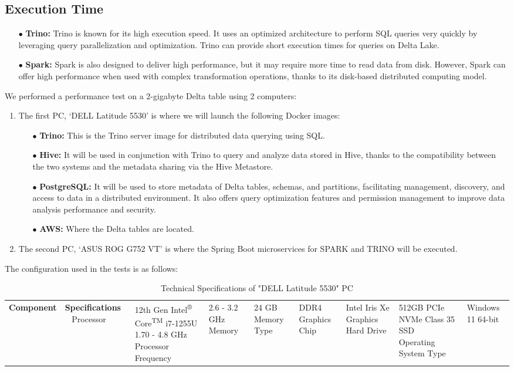 \subsection{Execution Time}
\begin{enumerate}
\item[$\bullet$] \textbf{Trino:} Trino is known for its high execution speed. It uses an optimized architecture to perform SQL queries very quickly by leveraging query parallelization and optimization. Trino can provide short execution times for queries on Delta Lake.
\item[$\bullet$] \textbf{Spark:} Spark is also designed to deliver high performance, but it may require more time to read data from disk. However, Spark can offer high performance when used with complex transformation operations, thanks to its disk-based distributed computing model.
\end{enumerate}

We performed a performance test on a 2-gigabyte Delta table using 2 computers:
\begin{enumerate}
\item The first PC, `DELL Latitude 5530' is where we will launch the following Docker images:
\begin{enumerate}
\item[$\bullet$] \textbf{Trino:} This is the Trino server image for distributed data querying using SQL.
\item[$\bullet$] \textbf{Hive:} It will be used in conjunction with Trino to query and analyze data stored in Hive, thanks to the compatibility between the two systems and the metadata sharing via the Hive Metastore.
\item[$\bullet$] \textbf{PostgreSQL:} It will be used to store metadata of Delta tables, schemas, and partitions, facilitating management, discovery, and access to data in a distributed environment. It also offers query optimization features and permission management to improve data analysis performance and security.
\item[$\bullet$] \textbf{AWS:} Where the Delta tables are located.
\end{enumerate}
\item The second PC, `ASUS ROG G752 VT' is where the Spring Boot microservices for SPARK and TRINO will be executed.
\end{enumerate}

The configuration used in the tests is as follows:
\begin{table}[h]
\centering
\label{tab:caracteristiques}
\begin{tabular}{|l|l|}
\hline
\textbf{Component} & \textbf{Specifications} \ \hline
Processor & 12th Gen Intel\textsuperscript{®} Core\textsuperscript{TM} i7-1255U 1.70 - 4.8 GHz \ \hline
Processor Frequency & 2.6 - 3.2 GHz \ \hline
Memory & 24 GB \ \hline
Memory Type & DDR4 \ \hline
Graphics Chip & Intel Iris Xe Graphics \ \hline
Hard Drive & 512GB PCIe NVMe Class 35 SSD \ \hline
Operating System Type & Windows 11 64-bit \ \hline
\end{tabular}
\caption{Technical Specifications of "DELL Latitude 5530" PC}
\end{table}

